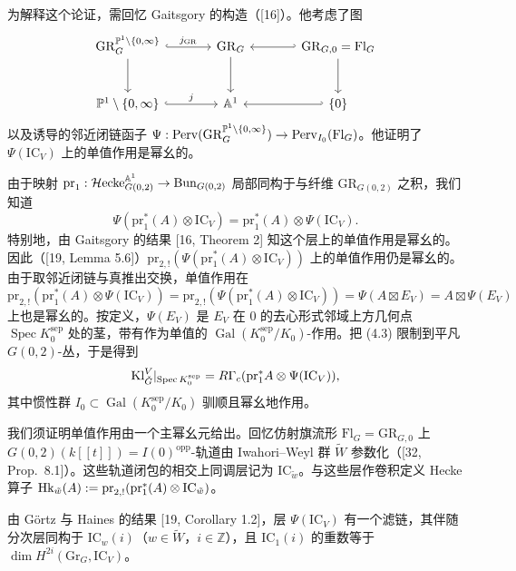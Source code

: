 为解释这个论证，需回忆 Gaitsgory 的构造（[16]）。他考虑了图
\[
\begin{tikzcd}[column sep=large, row sep=large]
\mathrm{GR}^{\PP^1\setminus\{0,\infty\}}_G \arrow[r, hook, "j_{\mathrm{GR}}"] \arrow[d] & \mathrm{GR}_G \arrow[d] & \mathrm{GR}_{G,0}=\mathrm{Fl}_G \arrow[l, hook'] \arrow[d] \\
\PP^1\setminus\{0,\infty\} \arrow[r, hook, "j"] & \Aff^1 & \{0\} \arrow[l, hook']
\end{tikzcd}
\]
以及诱导的邻近闭链函子 $\Psi:\mathrm{Perv}(\mathrm{GR}^{\mathbb{P}^1\setminus\{0,\infty\}}_G)\to\mathrm{Perv}_{I_0}(\mathrm{Fl}_G)$。他证明了 $\Psi(\mathrm{IC}_V)$ 上的单值作用是幂幺的。

由于映射 $\mathrm{pr}_1:\mathcal{H}\mathrm{ecke}^{\mathbb{A}^1}_{G(0,2)}\to\mathrm{Bun}_{G(0,2)}$ 局部同构于与纤维 $\mathrm{GR}_{G(0,2)}$ 之积，我们知道
\[
\Psi(\mathrm{pr}_1^*(A)\otimes\mathrm{IC}_V)=\mathrm{pr}_1^*(A)\otimes\Psi(\mathrm{IC}_V).
\]
特别地，由 Gaitsgory 的结果 [16, Theorem 2] 知这个层上的单值作用是幂幺的。因此（[19, Lemma 5.6]）$\mathrm{pr}_{2,!}(\Psi(\mathrm{pr}_1^*(A)\otimes\mathrm{IC}_V))$ 上的单值作用仍是幂幺的。由于取邻近闭链与真推出交换，单值作用在
\begin{equation}
\mathrm{pr}_{2,!}(\mathrm{pr}_1^*(A)\otimes\Psi(\mathrm{IC}_V))=\mathrm{pr}_{2,!}(\Psi(\mathrm{pr}_1^*(A)\otimes\mathrm{IC}_V))=\Psi(A\boxtimes E_V)=A\boxtimes\Psi(E_V)
\end{equation}
上也是幂幺的。按定义，$\Psi(E_V)$ 是 $E_V$ 在 $0$ 的去心形式邻域上方几何点 $\operatorname{Spec}K^{\mathrm{sep}}_0$ 处的茎，带有作为单值的 $\operatorname{Gal}(K^{\mathrm{sep}}_0/K_0)$-作用。把 (4.3) 限制到平凡 $G(0,2)$-丛，于是得到
\begin{equation}
\mathrm{Kl}^V_{\check G}|_{\operatorname{Spec}K^{\mathrm{sep}}_0}=R\Gamma_c(\mathrm{pr}_1^*A\otimes\Psi(\mathrm{IC}_V)),
\end{equation}
其中惯性群 $I_0\subset\operatorname{Gal}(K^{\mathrm{sep}}_0/K_0)$ 驯顺且幂幺地作用。

我们须证明单值作用由一个主幂幺元给出。回忆仿射旗流形 $\mathrm{Fl}_G=\mathrm{GR}_{G,0}$ 上 $G(0,2)(k[[t]])=I(0)^{\mathrm{opp}}$-轨道由 Iwahori--Weyl 群 $\widetilde W$ 参数化（[32, Prop.~8.1]）。这些轨道闭包的相交上同调层记为 $\mathrm{IC}_{\tilde w}$。与这些层作卷积定义 Hecke 算子 $\mathrm{Hk}_{\tilde w}(A):=\mathrm{pr}_{2,!}(\mathrm{pr}_1^*(A)\otimes\mathrm{IC}_{\tilde w})$。

由 Görtz 与 Haines 的结果 [19, Corollary 1.2]，层 $\Psi(\mathrm{IC}_V)$ 有一个滤链，其伴随分次层同构于 $\mathrm{IC}_w(i)$（$w\in\widetilde W$，$i\in\mathbb{Z}$），且 $\mathrm{IC}_1(i)$ 的重数等于 $\dim H^{2i}(\mathrm{Gr}_G,\mathrm{IC}_V)$。

